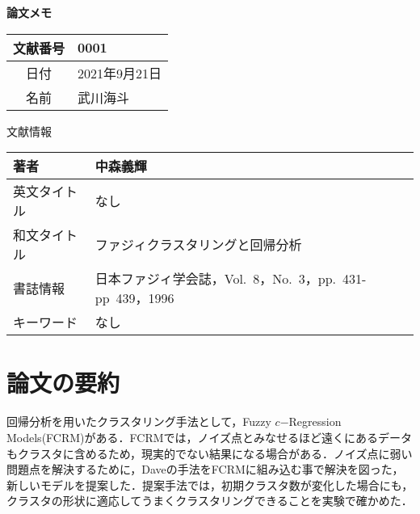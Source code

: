 \documentclass[10pt,onecolumn]{jsarticle}
\begin{document}
\vspace{-20mm}
\begin{center}
{\LARGE\textbf{論文メモ}}
\end{center}

\begin{flushright}
\begin{tabular}{|c|l|}
\hline
文献番号  &  0001
\\
\hline
日付  &  2021年9月21日
\\
\hline
名前  &  武川海斗
\\
\hline
\end{tabular}
\end{flushright}


%
%
\begin{center}
{\large 文献情報}
\begin{table}[hbp]%
\begin{tabular}{|l||l|}
\hline
著者  &  中森義輝
\\ \hline
英文タイトル  & なし
\\ \hline
和文タイトル  & ファジィクラスタリングと回帰分析
\\ \hline
書誌情報  &  日本ファジィ学会誌，Vol.~8，No.~3，pp.~431-pp~439，1996
\\ \hline
キーワード & なし
\\ \hline
\end{tabular}
\end{table}
\end{center}

\section{論文の要約}

回帰分析を用いたクラスタリング手法として，Fuzzy $c$−Regression Models(FCRM)\cite{ref1}がある．FCRMでは，ノイズ点とみなせるほど遠くにあるデータもクラスタに含めるため，現実的でない結果になる場合がある．ノイズ点に弱い問題点を解決するために，Daveの手法\cite{ref2}をFCRMに組み込む事で解決を図った，新しいモデルを提案した．提案手法では，初期クラスタ数が変化した場合にも，クラスタの形状に適応してうまくクラスタリングできることを実験で確かめた．
\end{document}
